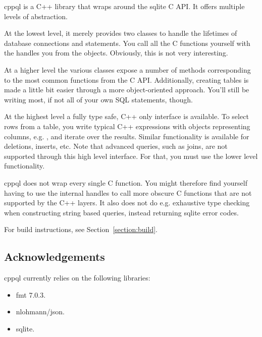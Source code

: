 \gls{cppql} is a C++ library that wraps around the \gls{sqlite} C API. It offers multiple levels of abstraction.

At the lowest level, it merely provides two classes to handle the lifetimes of database connections and \gls{statement}s. You call all the C functions yourself with the handles you  from the objects. Obviously, this is not very interesting.

At a higher level the various classes expose a number of methods corresponding to the most common functions from the C API. Additionally, creating tables is made a little bit easier through a more object-oriented approach. You'll still be writing most, if not all of your own SQL statements, though.

At the highest level a fully type safe, C++ only interface is available. To select rows from a table, you write typical C++ expressions with objects representing columns, e.g. , and iterate over the results. Similar functionality is available for deletions, inserts, etc. Note that advanced queries, such as joins, are not supported through this high level interface. For that, you must use the lower level functionality.

\gls{cppql} does not wrap every single C function. You might therefore find yourself having to use the internal handles to call more obscure C functions that are not supported by the C++ layers. It also does not do e.g. exhaustive type checking when constructing string based queries, instead returning \gls{sqlite} error codes.

For build instructions, see Section~\ref{section:build}.

\subsection{Acknowledgements}
\label{section:introduction:acknowledgements}

\gls{cppql} currently relies on the following libraries:
\begin{itemize}
	\item fmt 7.0.3\cite{fmt}.
	\item nlohmann/json\cite{nlohmann}.
	\item \gls{sqlite}\cite{sqlite}.
\end{itemize}